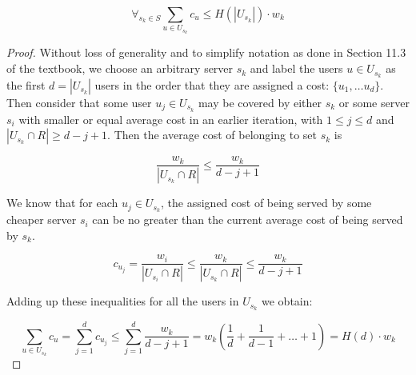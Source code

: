 \documentclass[12pt]{article}
\begin{document}

\begin{lemma}
\begin{displaymath}
\forall_{s_k \in S} \sum_{u \in U_{s_k}} c_u \le H(|U_{s_k}|)\cdot w_k
\end{displaymath}
\end{lemma}

\begin{proof}
Without loss of generality and to simplify notation as done in Section 11.3
of the textbook, we choose an arbitrary server $s_k$
and label the users $u \in U_{s_k}$ as the first $d = |U_{s_k}|$ users in the
order that they are assigned a cost:
$\{u_1,\ldots u_d\}$. Then consider that some user $u_j \in U_{s_k}$ may be
covered by either $s_k$ or some server $s_i$ with smaller or equal average
cost in an earlier iteration, with $1 \le j \le d$ and
$|U_{s_k} \cap R| \ge d-j+1$.
Then the average cost of belonging to set $s_k$ is

\begin{displaymath}
\frac{w_k}{|U_{s_k} \cap R|} \le
\frac{w_k}{d-j+1}
\end{displaymath}

We know that for each $u_j \in U_{s_k}$, the assigned cost of being served
by some cheaper server $s_i$ can be no greater
than the current average cost of being served by $s_k$.

\begin{displaymath}
c_{u_j} = \frac{w_i}{|U_{s_i} \cap R|} \le \frac{w_k}{|U_{s_k} \cap R|} \le \frac{w_k}{d-j+1}
\end{displaymath}

Adding up these inequalities for all the users in $U_{s_k}$ we obtain:

\begin{displaymath}
\sum_{u \in U_{s_k}} c_u = \sum_{j=1}^d c_{u_j} \le \sum_{j=1}^d \frac{w_k}{d-j+1} = w_k
\left(\frac{1}{d}+\frac{1}{d-1}+\ldots + 1 \right) = H(d)\cdot w_k
\end{displaymath}

\end{proof}

\end{document}
